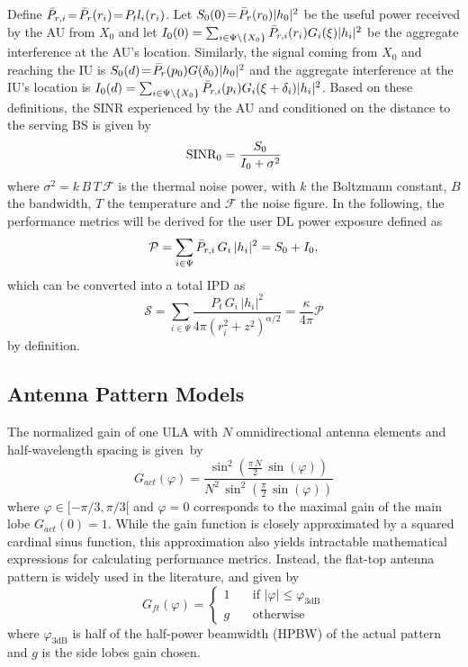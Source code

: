 Define $\Bar{P}_{r,i}\! =\! \Bar{P}_{r}(r_i) \!= \!P_t l_i(r_i)$. Let $S_0(0)\! =\! \Bar{P}_{r}(r_0)|h_0|^2$ be the useful power received by the AU from $X_0$ and let $I_0(0) = \sum_{i \in \Psi \setminus\left\{X_0\right\}} \Bar{P}_{r,i}(r_i) G_{i}(\xi) |h_i|^2$ be the aggregate interference at the AU's location. Similarly, the signal coming from $X_0$ and reaching the IU is $S_0(d)\! =\! \Bar{P}_{r}(p_0)G(\delta_0)|h_0|^2$ and the aggregate interference at the IU's location is $I_0(d) = \sum_{i \in \Psi \setminus\left\{X_0\right\}} \Bar{P}_{r,i}(p_i) G_{i}(\xi+\delta_i) |h_i|^2$. Based on these definitions, the SINR experienced by the AU and conditioned on the distance to the serving BS is given by
{\smalltonormalsize
\begin{align}\label{eq:SINR}
    \text{\normalfont{SINR}}_0 = \frac{S_0}{I_0 + \sigma^2}
\end{align}}where $\sigma^2 = k\,B\,T\,\mathcal{F}$ is the thermal noise power, with $k$ the Boltzmann constant, $B$ the bandwidth, $T$ the temperature and $\mathcal{F}$ the noise figure. In the following, the performance metrics will be derived for the user DL power exposure defined as
{\smalltonormalsize
\begin{align}\label{eq:expP}
    \mathcal{P} = \sum_{i \in \Psi} \Bar{P}_{r,i}\,G_{i}\, |h_i|^2 = S_0+I_0,
\end{align}}which can be converted into a total IPD as
{\smalltonormalsize
\begin{equation}\label{eq:ExpWM2}
    \mathcal{S} = \sum_{i \in \Psi} \frac{P_{t}\,G_{i}\,|h_i|^2}{4\pi \left(r_i^2+z^2\right)^{\alpha/2}} = \frac{\kappa}{4\pi}\mathcal{P}
\end{equation}}by definition.

\subsection{Antenna Pattern Models}
\label{ssec:gain}
The normalized gain of one ULA with $N$ omnidirectional antenna elements and half-wavelength spacing is given~by
\begin{equation}\label{eq:Gact}
    G_{act}(\varphi) = \frac{\sin^2\left(\frac{\pi\,N}{2}\,\sin(\varphi)\right)}{N^2\,\sin^2\left(\frac{\pi}{2}\,\sin(\varphi)\right)}
\end{equation} where $\varphi \in [-\pi/3, \pi/3[$ and $\varphi = 0$ corresponds to the maximal gain of the main lobe $G_{act}(0) = 1$. While the gain function is closely approximated by a squared cardinal sinus function, this approximation also yields intractable mathematical expressions for calculating performance metrics. Instead, the flat-top antenna pattern is widely used in the literature, and given by
\begin{equation}\label{eq:Gft}G_{ft}(\varphi) = \left\{
    \begin{array}{ll}
    1   \quad  & \text{if  } |\varphi|\leq \varphi_{3\text{dB}} \\
    g    \quad &  \text{otherwise}
    \end{array}\right.
\end{equation} where $\varphi_{3\text{dB}}$ is half of the half-power beamwidth (HPBW) of the actual pattern and $g$ is the side lobes gain chosen.

